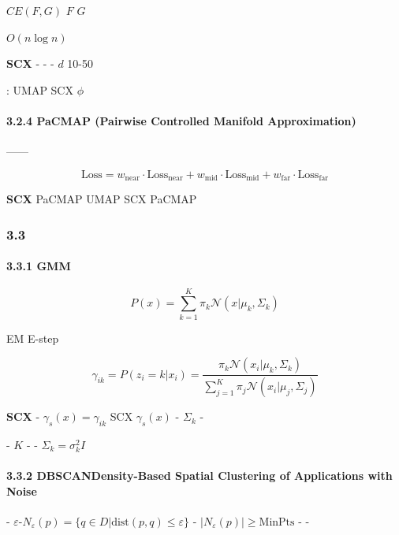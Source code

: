 \documentclass[
  12pt,
]{article}
\begin{document}
\textbf{} \(CE(F, G)\) \(F\)
\(G\) 

\textbf{}\(O(n \log n)\)

\textbf{SCX } -  -
 - \(d\)  10-50

\textbf{}: UMAP  SCX  \(\phi\) 

\paragraph{3.2.4 PaCMAP (Pairwise Controlled Manifold
Approximation)}\label{pacmap-pairwise-controlled-manifold-approximation}

\textbf{}------

\[\text{Loss} = w_{\text{near}} \cdot \text{Loss}_{\text{near}} + w_{\text{mid}} \cdot \text{Loss}_{\text{mid}} + w_{\text{far}} \cdot \text{Loss}_{\text{far}}\]

\textbf{SCX }PaCMAP  UMAP SCX
PaCMAP 

\subsubsection{3.3
}\label{ux805aux7c7bux65b9ux6cd5ux5bf9ux6bd4ux5206ux6790}

\paragraph{3.3.1
GMM}\label{gmmux9ad8ux65afux6df7ux5408ux6a21ux578b}

\textbf{}

\[P(x) = \sum_{k=1}^K \pi_k \mathcal{N}(x | \mu_k, \Sigma_k)\]

\textbf{}EM E-step 

\[\gamma_{ik} = P(z_i = k | x_i) = \frac{\pi_k \mathcal{N}(x_i | \mu_k, \Sigma_k)}{\sum_{j=1}^K \pi_j \mathcal{N}(x_i | \mu_j, \Sigma_j)}\]

\textbf{SCX } - 
\(\gamma_s(x) = \gamma_{ik}\) SCX  \(\gamma_s(x)\)  -
 \(\Sigma_k\)  - 

\textbf{} -  \(K\) - 
-  \(\Sigma_k = \sigma_k^2 I\)


\paragraph{3.3.2 DBSCANDensity-Based Spatial Clustering of
Applications with
Noise}\label{dbscandensity-based-spatial-clustering-of-applications-with-noise}

\textbf{} -
\(\varepsilon\)-\(N_\varepsilon(p) = \{q \in D | \text{dist}(p,q) \leq \varepsilon\}\)
- \(|N_\varepsilon(p)| \geq \text{MinPts}\) -
 -
\end{document}
